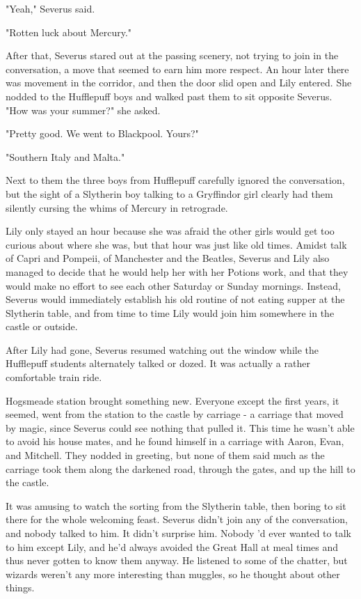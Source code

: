 \documentclass[a4paper,11pt]{article}
\begin{document}
"Yeah," Severus said.

"Rotten luck about Mercury."

After that, Severus stared out at the passing scenery, not trying to join in the conversation, a move that seemed to earn him more respect. An hour later there was movement in the corridor, and then the door slid open and Lily entered. She nodded to the Hufflepuff boys and walked past them to sit opposite Severus. "How was your summer?" she asked.

"Pretty good. We went to Blackpool. Yours?"

"Southern Italy and Malta."

Next to them the three boys from Hufflepuff carefully ignored the conversation, but the sight of a Slytherin boy talking to a Gryffindor girl clearly had them silently cursing the whims of Mercury in retrograde.

Lily only stayed an hour because she was afraid the other girls would get too curious about where she was, but that hour was just like old times. Amidst talk of Capri and Pompeii, of Manchester and the Beatles, Severus and Lily also managed to decide that he would help her with her Potions work, and that they would make no effort to see each other Saturday or Sunday mornings. Instead, Severus would immediately establish his old routine of not eating supper at the Slytherin table, and from time to time Lily would join him somewhere in the castle or outside.

After Lily had gone, Severus resumed watching out the window while the Hufflepuff students alternately talked or dozed. It was actually a rather comfortable train ride.

Hogsmeade station brought something new. Everyone except the first years, it seemed, went from the station to the castle by carriage - a carriage that moved by magic, since Severus could see nothing that pulled it. This time he wasn't able to avoid his house mates, and he found himself in a carriage with Aaron, Evan, and Mitchell. They nodded in greeting, but none of them said much as the carriage took them along the darkened road, through the gates, and up the hill to the castle.

It was amusing to watch the sorting from the Slytherin table, then boring to sit there for the whole welcoming feast. Severus didn't join any of the conversation, and nobody talked to him. It didn't surprise him. Nobody 'd ever wanted to talk to him except Lily, and he'd always avoided the Great Hall at meal times and thus never gotten to know them anyway. He listened to some of the chatter, but wizards weren't any more interesting than muggles, so he thought about other things.
\end{document}
